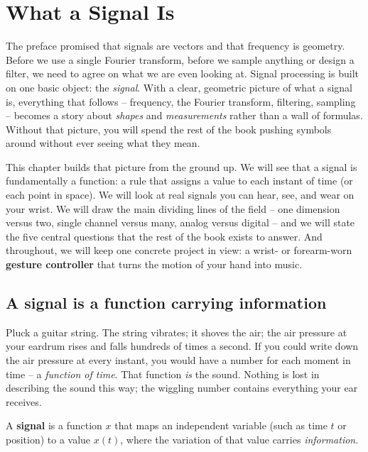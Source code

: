 \chapter{What a Signal Is}

\chapterline

The preface promised that signals are vectors and that frequency is geometry. Before we use
a single Fourier transform, before we sample anything or design a filter, we
need to agree on what we are even looking at. Signal processing is built on
one basic object: the \emph{signal}. With a clear, geometric picture of what a
signal is, everything that follows -- frequency, the Fourier transform, filtering,
sampling -- becomes a story about \emph{shapes} and \emph{measurements} rather than a wall of
formulas. Without that picture, you will spend the rest of the book pushing symbols around
without ever seeing what they mean.

This chapter builds that picture from the ground up. We will see that a signal is fundamentally
a function: a rule that assigns a value to each instant of time (or each point in space).
We will look at real signals you can hear, see, and wear on your wrist. We will draw the main
dividing lines of the field -- one dimension versus two, single channel versus many, analog
versus digital -- and we will state the five central questions that the rest of the book exists
to answer. And throughout, we will keep one concrete project in view: a wrist- or forearm-worn
\textbf{gesture controller} that turns the motion of your hand into music.

\section{A signal is a function carrying information}
\label{ch01:defn}

Pluck a guitar string. The string vibrates; it shoves the air; the air pressure at your eardrum
rises and falls hundreds of times a second. If you could write down the air pressure at every
instant, you would have a number for each moment in time -- a \emph{function of time}. That
function \emph{is} the sound. Nothing is lost in describing the sound this way; the wiggling
number contains everything your ear receives.

\begin{definition}
\label{ch01:signal-defn}
A \textbf{signal} is a function $x$ that maps an independent variable (such as time $t$ or
position) to a value $x(t)$, where the variation of that value carries \emph{information}.
\end{definition}

